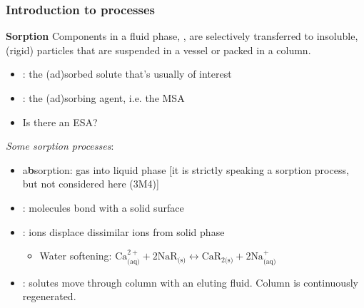 \begin{frame}\frametitle{Introduction to \textbf{{\color{purple}{sorption}}} processes}
	\begin{exampleblock}{\textbf{Sorption}}
		Components in a fluid phase, {\color{myGreen}{solutes}}, are selectively transferred to insoluble, (rigid) particles that are suspended in a vessel or packed in a column.
	\end{exampleblock}
	\begin{itemize}
		\item	{\color{purple}{(ad)sorbate}}: the (ad)sorbed solute that's usually of interest
		\item	{\color{purple}{(ad)sorbent}}: the (ad)sorbing agent, i.e. the MSA
		\item	Is there an ESA?
	\end{itemize}
	
	\vspace{12pt}
	\emph{Some sorption processes}:
	\begin{itemize}
		\item	a\textbf{b}sorption: gas into liquid phase [it is strictly speaking a sorption process, but not considered here (3M4)]
		\item	{\color{purple}{adsorption}}: molecules bond with a solid surface
		\item	{\color{purple}{ion-exchange}}: ions displace dissimilar ions from solid phase
			\begin{itemize}
				\item	Water softening: $\text{Ca}^{2+}_\text{(aq)} + 2\text{NaR}_\text{(s)} \longleftrightarrow \text{CaR}_{2\text{(s)}} + 2\text{Na}^{+}_\text{(aq)}$
			\end{itemize}
		\item	{\color{purple}{chromatography}}: solutes move through column with an eluting fluid. Column is continuously regenerated.
	\end{itemize}	
\end{frame}

